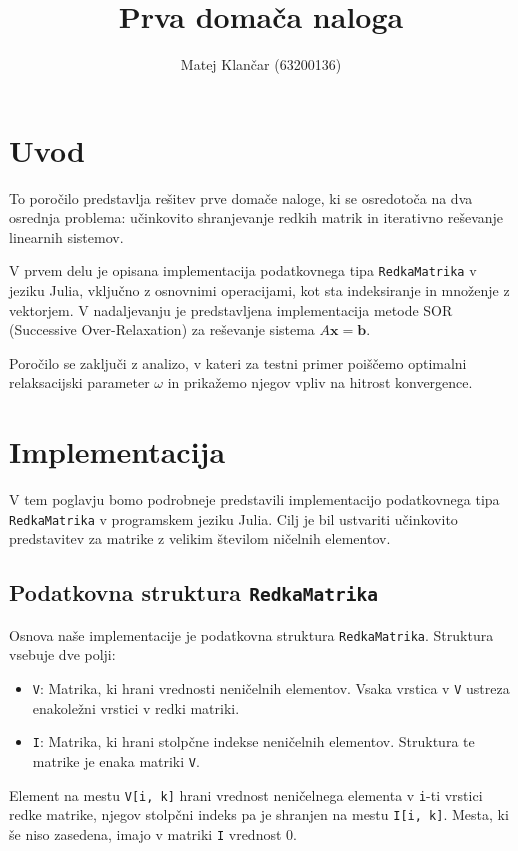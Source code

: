 \documentclass{article}
\title{Prva domača naloga}
\author{
Matej Klančar (63200136)
}
\begin{document}
\maketitle
\vspace{-1.5cm}
\section{Uvod}
To poročilo predstavlja rešitev prve domače naloge, 
ki se osredotoča na dva osrednja problema: učinkovito shranjevanje 
redkih matrik in iterativno reševanje linearnih sistemov.

V prvem delu je opisana implementacija podatkovnega tipa 
\texttt{RedkaMatrika} v jeziku Julia, vključno z osnovnimi operacijami, 
kot sta indeksiranje in množenje z vektorjem. V nadaljevanju je predstavljena 
implementacija metode SOR (Successive Over-Relaxation) za reševanje sistema 
$A\boldsymbol{x} = \boldsymbol{b}$.

Poročilo se zaključi z analizo, v kateri za testni primer poiščemo 
optimalni relaksacijski parameter $\omega$ in prikažemo njegov vpliv na hitrost 
konvergence.

\section{Implementacija}

V tem poglavju bomo podrobneje predstavili implementacijo podatkovnega 
tipa \texttt{RedkaMatrika} v programskem jeziku Julia. Cilj je bil ustvariti 
učinkovito predstavitev za matrike z velikim številom ničelnih elementov.

\subsection{Podatkovna struktura \texttt{RedkaMatrika}}

Osnova naše implementacije je podatkovna struktura \texttt{RedkaMatrika}. 
Struktura vsebuje dve polji:
\begin{itemize}
    \item \texttt{V}: Matrika, ki hrani vrednosti neničelnih elementov. Vsaka 
    vrstica v \texttt{V} ustreza enakoležni vrstici v redki matriki.
    \item \texttt{I}: Matrika, ki hrani stolpčne indekse neničelnih elementov. 
    Struktura te matrike je enaka matriki \texttt{V}.
\end{itemize}
Element na mestu \texttt{V[i, k]} hrani vrednost neničelnega elementa v 
\texttt{i}-ti vrstici redke matrike, njegov stolpčni indeks pa je shranjen 
na mestu \texttt{I[i, k]}. Mesta, ki še niso zasedena, imajo v matriki 
\texttt{I} vrednost 0.
\end{document}
